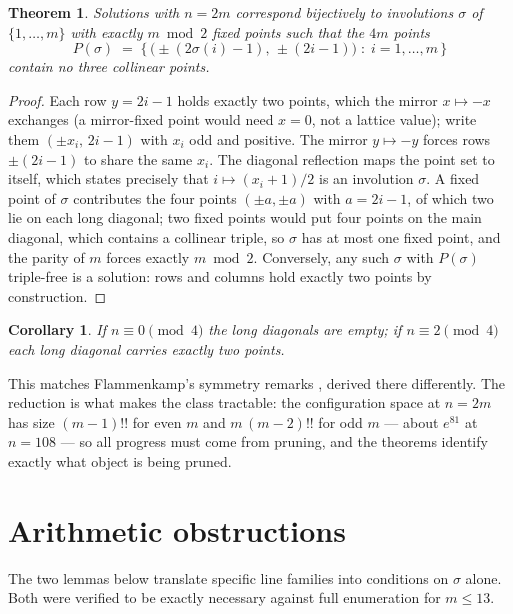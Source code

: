 \documentclass[11pt]{article}
\newtheorem{theorem}{Theorem}
\newtheorem{corollary}{Corollary}
\theoremstyle{remark}
\begin{document}
\begin{theorem}\label{thm:inv}
Solutions with $n=2m$ correspond bijectively to involutions $\sigma$ of
$\{1,\dots,m\}$ with exactly $m\bmod 2$ fixed points such that the $4m$
points
\[
P(\sigma)\;=\;\bigl\{\,\bigl(\pm(2\sigma(i)-1),\,\pm(2i-1)\bigr)\;:\;
i=1,\dots,m\,\bigr\}
\]
contain no three collinear points.
\end{theorem}

\begin{proof}
Each row $y=2i-1$ holds exactly two points,
which the mirror $x\mapsto-x$ exchanges
(a mirror-fixed point would need $x=0$, not a lattice value);
write them $(\pm x_i,\,2i-1)$ with $x_i$ odd and positive.
The mirror $y\mapsto -y$ forces rows $\pm(2i-1)$ to share the same $x_i$.
The diagonal reflection maps the point set to itself,
which states precisely that $i\mapsto (x_i+1)/2$ is an involution $\sigma$.
A fixed point of $\sigma$ contributes the four points $(\pm a,\pm a)$ with
$a=2i-1$,
of which two lie on each long diagonal;
two fixed points would put four points on the main diagonal,
which contains a collinear triple,
so $\sigma$ has at most one fixed point,
and the parity of $m$ forces exactly $m \bmod 2$.
Conversely, any such $\sigma$ with $P(\sigma)$ triple-free is a solution:
rows and columns hold exactly two points by construction.
\end{proof}

\begin{corollary}
If $n\equiv 0 \pmod 4$ the long diagonals are empty;
if $n\equiv 2\pmod 4$ each long diagonal carries exactly two points.
\end{corollary}

This matches Flammenkamp's symmetry remarks \cite{FlamSym},
derived there differently.
The reduction is what makes the class tractable:
the configuration space at $n=2m$ has size $(m-1)!!$ for even $m$ and
$m\,(m-2)!!$ for odd $m$
--- about $e^{81}$ at $n=108$ ---
so all progress must come from pruning,
and the theorems identify exactly what object is being pruned.

\section{Arithmetic obstructions}\label{sec:arith}

The two lemmas below translate specific line families into conditions on
$\sigma$ alone.
Both were verified to be exactly necessary against full enumeration for
$m\le 13$.
\end{document}
